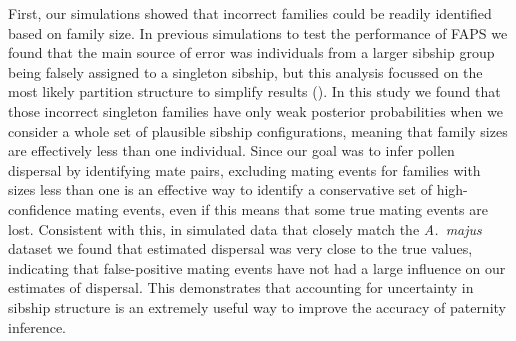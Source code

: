 \documentclass[10pt, a4paper, twocolumn]{article} %
\begin{document}
First, our simulations showed that incorrect families could be readily identified based on family size.
In previous simulations to test the performance of FAPS we found that the main source of error was individuals from a larger sibship group being falsely assigned to a singleton sibship, but this analysis focussed on the most likely partition structure to simplify results (\cite{ellis2018efficient}).
In this study we found that those incorrect singleton families have only weak posterior probabilities when we consider a whole set of plausible sibship configurations, meaning that family sizes are effectively less than one individual.
Since our goal was to infer pollen dispersal by identifying mate pairs, excluding mating events for families with sizes less than one is an effective way to identify a conservative set of high-confidence mating events, even if this means that some true mating events are lost.
Consistent with this, in simulated data that closely match the \textit{A.~majus} dataset we found that estimated dispersal was very close to the true values, indicating that false-positive mating events have not had a large influence on our estimates of dispersal.
This demonstrates that accounting for uncertainty in sibship structure is an extremely useful way to improve the accuracy of paternity inference.
\end{document}
